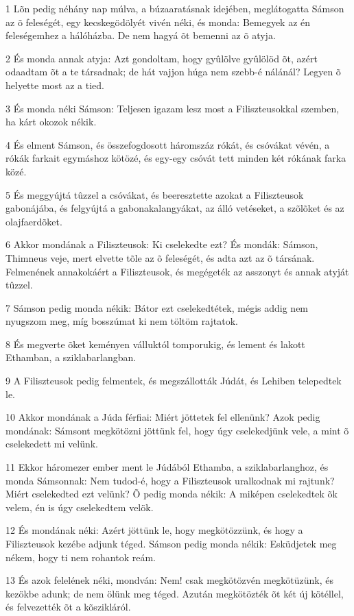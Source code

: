 \par 1 Lõn pedig néhány nap múlva, a búzaaratásnak idejében, meglátogatta Sámson az õ feleségét, egy kecskegödölyét vivén néki, és monda: Bemegyek az én feleségemhez a hálóházba. De nem hagyá õt bemenni az õ atyja.
\par 2 És monda annak atyja: Azt gondoltam, hogy gyûlölve gyûlölöd õt, azért odaadtam õt a te társadnak; de hát vajjon húga nem szebb-é nálánál? Legyen õ helyette most az a tied.
\par 3 És monda néki Sámson: Teljesen igazam lesz most a Filiszteusokkal szemben, ha kárt okozok nékik.
\par 4 És elment Sámson, és összefogdosott háromszáz rókát, és csóvákat vévén, a rókák farkait egymáshoz kötözé, és egy-egy csóvát tett minden két rókának farka közé.
\par 5 És meggyújtá tûzzel a csóvákat, és beeresztette azokat a Filiszteusok gabonájába, és felgyújtá a gabonakalangyákat, az álló vetéseket, a szõlõket és az olajfaerdõket.
\par 6 Akkor mondának a Filiszteusok: Ki cselekedte ezt? És mondák: Sámson, Thimneus veje, mert elvette tõle az õ feleségét, és adta azt az õ társának. Felmenének annakokáért a Filiszteusok, és megégeték az asszonyt és annak atyját tûzzel.
\par 7 Sámson pedig monda nékik: Bátor ezt cselekedtétek, mégis addig nem nyugszom meg, míg bosszúmat ki nem töltöm rajtatok.
\par 8 És megverte õket keményen válluktól tomporukig, és lement és lakott Ethamban, a sziklabarlangban.
\par 9 A Filiszteusok pedig felmentek, és megszállották Júdát, és Lehiben telepedtek le.
\par 10 Akkor mondának a Júda férfiai: Miért jöttetek fel ellenünk? Azok pedig mondának: Sámsont megkötözni jöttünk fel, hogy úgy cselekedjünk vele, a mint õ cselekedett mi velünk.
\par 11 Ekkor háromezer ember ment le Júdából Ethamba, a sziklabarlanghoz, és monda Sámsonnak: Nem tudod-é, hogy a Filiszteusok uralkodnak mi rajtunk? Miért cselekedted ezt velünk? Õ pedig monda nékik: A miképen cselekedtek õk velem, én is úgy cselekedtem velök.
\par 12 És mondának néki: Azért jöttünk le, hogy megkötözzünk, és hogy a Filiszteusok kezébe adjunk téged. Sámson pedig monda nékik: Esküdjetek meg nékem, hogy ti nem rohantok reám.
\par 13 És azok felelének néki, mondván: Nem! csak megkötözvén megkötüzünk, és kezökbe adunk; de nem ölünk meg téged. Azután megkötözték õt két új kötéllel, és felvezették õt a kõszikláról.
